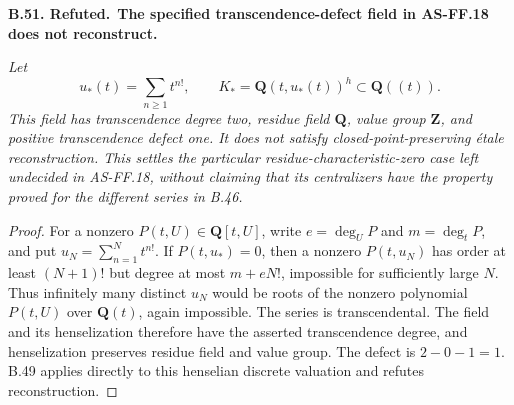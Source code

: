 \documentclass[11pt,a4paper]{article}
\newcommand{\Z}{\mathbf Z}
\newcommand{\Q}{\mathbf Q}
\newenvironment{claim}[3]{\par\medskip\noindent\hypertarget{#1}{\textbf{#1. #2.}}\ \textbf{#3.}\par\nopagebreak\smallskip\begingroup\itshape}{\endgroup\par\smallskip}
\begin{document}
\begin{claim}{B.51}{Refuted}{The specified transcendence-defect field in AS-FF.18 does not reconstruct}
Let
\[
     u_*(t)=\sum_{n\geq1}t^{n!},\qquad
     K_* =\Q(t,u_*(t))^h\subset\Q((t)).                  \tag{B.CF.19}
\]
This field has transcendence degree two, residue field \(\Q\),
value group \(\Z\), and positive transcendence defect one.
It does not satisfy closed-point-preserving étale reconstruction.
This settles the particular residue-characteristic-zero case
left undecided in AS-FF.18, without claiming that its centralizers
have the property proved for the different series in B.46.
\end{claim}
\begin{proof}
For a nonzero \(P(t,U)\in\Q[t,U]\), write \(e=\deg_U P\)
and \(m=\deg_t P\), and put
\(u_N=\sum_{n=1}^N t^{n!}\). If \(P(t,u_*)=0\), then a
nonzero \(P(t,u_N)\) has order at least \((N+1)!\) but degree
at most \(m+eN!\), impossible for sufficiently large \(N\).
Thus infinitely many distinct \(u_N\) would be roots of the
nonzero polynomial \(P(t,U)\) over \(\Q(t)\), again impossible.
The series is transcendental. The field and its henselization
therefore have the asserted transcendence degree, and
henselization preserves residue field and value group.
The defect is \(2-0-1=1\). B.49 applies directly to this
henselian discrete valuation and refutes reconstruction.
\end{proof}
\end{document}
